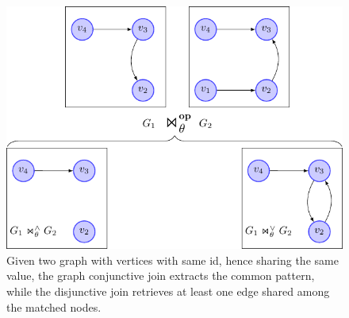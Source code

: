 \begin{figure}[!t]
	\centering
	\includegraphics[scale=0.7]{fig/03joins/g1g2_general_conjdisj.pdf}
	\caption{Given two graph with vertices with same id, hence sharing the same value, the graph conjunctive
		join extracts the common pattern, while the disjunctive join retrieves at least one edge shared
		among the matched nodes.}
	\label{fig:conjdisjbasicex}
\end{figure}









